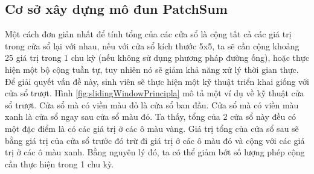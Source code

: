 \subsection{Cơ sở xây dựng mô đun PatchSum}
Một cách đơn giản nhất để tính tổng của các cửa sổ là cộng tất cả các giá trị trong cửa sổ lại với nhau, nếu với cửa sổ kích thước 5x5, ta sẽ cần cộng khoảng 25 giá trị trong 1 chu kỳ (nếu không sử dụng phương pháp đường ống), hoặc thực hiện một bộ cộng tuần tự, tuy nhiên nó sẽ giảm khả năng xử lý thời gian thực. Để giải quyết vấn đề này, sinh viên sẽ thực hiện một kỹ thuật triển khai giống với cửa sổ trượt. Hình \ref{fig:slidingWindowPrincipla} mô tả một ví dụ về kỹ thuật cửa sổ trượt. Cửa sổ mà có viền màu đỏ là cửa sổ ban đầu. Cửa sổ mà có viền màu xanh là cửa sổ ngay sau cửa sổ màu đỏ. Ta thấy, tổng của 2 cửa sổ này đều có một đặc điểm là có các giá trị ở các ô màu vàng. Giá trị tổng của cửa sổ sau sẽ bằng giá trị của cửa sổ trước đó trừ đi giá trị ở các ô màu đỏ và cộng với các giá trị ở các ô màu xanh. Bằng nguyên lý đó, ta có thể giảm bớt số lượng phép cộng cần thực hiện trong 1 chu kỳ.


